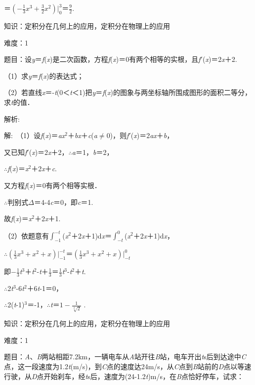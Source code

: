 \documentclass{article} %
\begin{document}
＝$(-\frac{1}{3}x^3+\frac{3}{2}x^2)|_0^3$＝$\frac{9}{2}$.



 知识：定积分在几何上的应用，定积分在物理上的应用

 难度：1

 题目：设\textit{y}＝\textit{f}(\textit{x})是二次函数，方程\textit{f}(\textit{x})＝0有两个相等的实根，且\textit{f}$\mathrm{\prime}$(\textit{x})＝2\textit{x}＋2.

（1）求\textit{y}＝\textit{f}(\textit{x})的表达式；

（2）若直线\textit{x}＝-\textit{t}(0＜\textit{t}＜1)把\textit{y}＝\textit{f}(\textit{x})的图象与两坐标轴所围成图形的面积二等分，求\textit{t}的值．

 解析:

 解:　（1）设\textit{f}(\textit{x})＝\textit{ax}${}^{2}$＋\textit{bx}＋\textit{c}(\textit{a}$\mathrm{\neq}$0)，则\textit{f}$\mathrm{\prime}$(\textit{x})＝2\textit{ax}＋\textit{b}，

又已知\textit{f}$\mathrm{\prime}$(\textit{x})＝2\textit{x}＋2，$\mathrm{\therefore}$\textit{a}＝1，\textit{b}＝2，

$\mathrm{\therefore}$\textit{f}(\textit{x})＝\textit{x}${}^{2}$＋2\textit{x}＋\textit{c}.

又方程\textit{f}(\textit{x})＝0有两个相等实根．

$\mathrm{\therefore}$判别式$\Delta$＝4-4\textit{c}＝0，即\textit{c}＝1.

故\textit{f}(\textit{x})＝\textit{x}${}^{2}$＋2\textit{x}＋1.

（2）依题意有$\int_{-1}^{-t}$(\textit{x}${}^{2}$＋2\textit{x}＋1)d\textit{x}＝$\int_{-t}^{0}$(\textit{x}${}^{2}$＋2\textit{x}＋1)d\textit{x}，

$\mathrm{\therefore}$$(\frac{1}{3}x^3+x^2+x)|_{-1}^{-t}$＝$(\frac{1}{3}x^3+x^2+x)|_{-t}^0$

即$-\frac{1}{3}$\textit{t}${}^{3}$＋\textit{t}${}^{2}$-\textit{t}＋$\frac{1}{3}$＝$\frac{1}{3}$\textit{t}${}^{3}$-\textit{t}${}^{2}$＋\textit{t}.

$\mathrm{\therefore}$2\textit{t}${}^{3}$-6\textit{t}${}^{2}$＋6\textit{t}-1＝0，

$\mathrm{\therefore}$2(\textit{t}-1)${}^{3}$＝-1，$\mathrm{\therefore}$\textit{t}＝$1-\frac{1}{\sqrt[3]{2}}$ .



 知识：定积分在几何上的应用，定积分在物理上的应用

 难度：1

 题目：\textit{A}、\textit{B}两站相距7.2km，一辆电车从\textit{A}站开往\textit{B}站，电车开出\textit{t}s后到达途中\textit{C}点，这一段速度为1.2\textit{t}(m/s)，到\textit{C}点的速度达24m/s，从\textit{C}点到\textit{B}站前的\textit{D}点以等速行驶，从\textit{D}点开始刹车，经\textit{t}s后，速度为(24-1.2\textit{t})m/s，在\textit{B}点恰好停车，试求：
\end{document}
